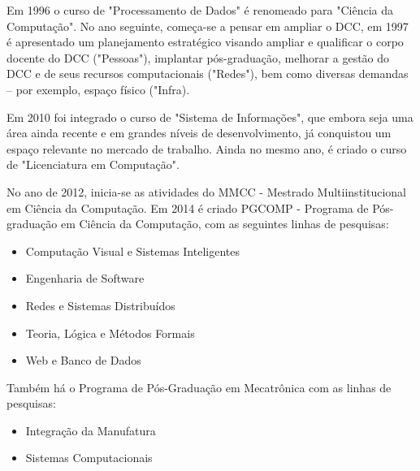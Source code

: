 Em 1996 o curso de "Processamento de Dados" é  renomeado para "Ciência da Computação". No ano seguinte, começa-se a pensar em ampliar o DCC, em 1997 é apresentado um planejamento estratégico visando ampliar e qualificar o corpo docente do DCC ("Pessoas"), implantar pós-graduação, melhorar a gestão do DCC e de seus recursos computacionais ("Redes"), bem como diversas demandas -- por exemplo, espaço físico ("Infra).

Em 2010 foi integrado o curso de "Sistema de Informações", que embora seja uma área ainda recente e em grandes níveis de desenvolvimento, já conquistou um espaço relevante no mercado de trabalho. Ainda no mesmo ano, é criado o curso de "Licenciatura em Computação".
  
No ano de 2012, inicia-se as atividades do  MMCC - Mestrado Multiinstitucional em Ciência da Computação. Em 2014 é criado PGCOMP - Programa de Pós-graduação em Ciência da Computação, com as seguintes linhas de pesquisas: 
       \begin{itemize}

  \item Computação Visual e Sistemas Inteligentes
 \item Engenharia de Software
 \item Redes e Sistemas Distribuídos
 \item Teoria, Lógica e Métodos Formais
 \item Web e Banco de Dados\\
                 \end{itemize}
	Também há o Programa de Pós-Graduação em Mecatrônica com as linhas de pesquisas:

\begin{itemize}
  \item Integração da Manufatura
 \item Sistemas Computacionais\\
\end{itemize}
  
